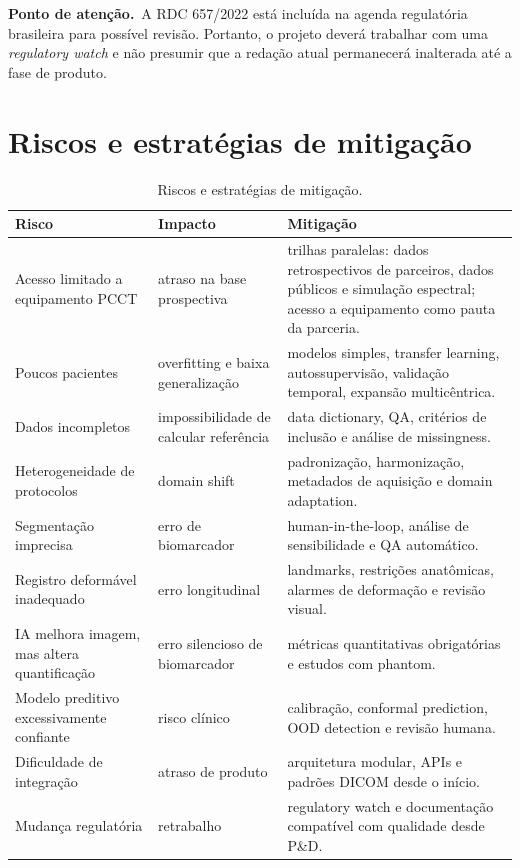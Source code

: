 \documentclass[11pt,a4paper]{article}
\newcommand{\atencao}{\textcolor{titleblue}{\textbf{Ponto de atenção.}}\ }
\begin{document}
\begin{caixa}
\atencao A RDC 657/2022 está incluída na agenda regulatória brasileira para possível revisão. Portanto, o projeto deverá trabalhar com uma \emph{regulatory watch} e não presumir que a redação atual permanecerá inalterada até a fase de produto.
\end{caixa}

\section{Riscos e estratégias de mitigação}

\begin{table}[htbp]
\centering
\caption{Riscos e estratégias de mitigação.}
\begin{tabular}{p{3.6cm}p{3.8cm}p{5.8cm}}
\toprule
\textbf{Risco} & \textbf{Impacto} & \textbf{Mitigação}\\
\midrule
Acesso limitado a equipamento PCCT & atraso na base prospectiva & trilhas paralelas: dados retrospectivos de parceiros, dados públicos e simulação espectral; acesso a equipamento como pauta da parceria.\\
Poucos pacientes & overfitting e baixa generalização & modelos simples, transfer learning, autossupervisão, validação temporal, expansão multicêntrica.\\
Dados incompletos & impossibilidade de calcular referência & data dictionary, QA, critérios de inclusão e análise de missingness.\\
Heterogeneidade de protocolos & domain shift & padronização, harmonização, metadados de aquisição e domain adaptation.\\
Segmentação imprecisa & erro de biomarcador & human-in-the-loop, análise de sensibilidade e QA automático.\\
Registro deformável inadequado & erro longitudinal & landmarks, restrições anatômicas, alarmes de deformação e revisão visual.\\
IA melhora imagem, mas altera quantificação & erro silencioso de biomarcador & métricas quantitativas obrigatórias e estudos com phantom.\\
Modelo preditivo excessivamente confiante & risco clínico & calibração, conformal prediction, OOD detection e revisão humana.\\
Dificuldade de integração & atraso de produto & arquitetura modular, APIs e padrões DICOM desde o início.\\
Mudança regulatória & retrabalho & regulatory watch e documentação compatível com qualidade desde P\&D.\\
\bottomrule
\end{tabular}
\end{table}
\end{document}
